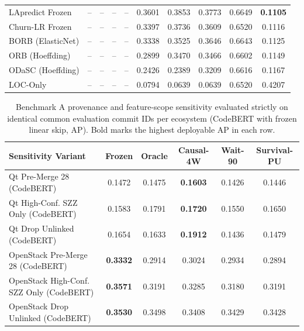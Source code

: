 \documentclass[10pt,a4paper]{article}
\begin{document}
\begin{table}[!htbp]
\begin{tabular*}{\textwidth}{@{\extracolsep\fill}lccccccccc@{}}
LApredict Frozen & -- & -- & -- & -- & 0.3601 & 0.3853 & 0.3773 & 0.6649 & \textbf{0.1105} \\
Churn-LR Frozen & -- & -- & -- & -- & 0.3397 & 0.3736 & 0.3609 & 0.6520 & 0.1116 \\
BORB (ElasticNet) & -- & -- & -- & -- & 0.3338 & 0.3525 & 0.3646 & 0.6643 & 0.1125 \\
ORB (Hoeffding) & -- & -- & -- & -- & 0.2899 & 0.3470 & 0.3466 & 0.6602 & 0.1149 \\
ODaSC (Hoeffding) & -- & -- & -- & -- & 0.2426 & 0.2389 & 0.3209 & 0.6616 & 0.1167 \\
LOC-Only & -- & -- & -- & -- & 0.0794 & 0.0639 & 0.0639 & 0.6520 & 0.4207 \\
\bottomrule
\end{tabular*}
\end{table}

\begin{table}[!htbp]
\centering
\caption{Benchmark A provenance and feature-scope sensitivity evaluated strictly on identical common evaluation commit IDs per ecosystem (CodeBERT with frozen linear skip, AP). Bold marks the highest deployable AP in each row.}
\label{tab:bench_a_sens}
\fontsize{7.5}{9.0}\selectfont
\setlength{\tabcolsep}{2.4pt}
\begin{tabular*}{\textwidth}{@{\extracolsep\fill}lccccc@{}}
\toprule
\textbf{Sensitivity Variant} & \textbf{Frozen} & \textbf{Oracle} & \textbf{Causal-4W} & \textbf{Wait-90} & \textbf{Survival-PU} \\
\midrule
Qt Pre-Merge 28 (CodeBERT) & 0.1472 & 0.1475 & \textbf{0.1603} & 0.1426 & 0.1446 \\
Qt High-Conf. SZZ Only (CodeBERT) & 0.1583 & 0.1791 & \textbf{0.1720} & 0.1550 & 0.1650 \\
Qt Drop Unlinked (CodeBERT) & 0.1654 & 0.1633 & \textbf{0.1912} & 0.1436 & 0.1479 \\
OpenStack Pre-Merge 28 (CodeBERT) & \textbf{0.3332} & 0.2914 & 0.3024 & 0.2934 & 0.2894 \\
OpenStack High-Conf. SZZ Only (CodeBERT) & \textbf{0.3571} & 0.3191 & 0.3285 & 0.3180 & 0.3191 \\
OpenStack Drop Unlinked (CodeBERT) & \textbf{0.3530} & 0.3498 & 0.3408 & 0.3429 & 0.3428 \\
\bottomrule
\end{tabular*}
\end{table}
\end{document}
